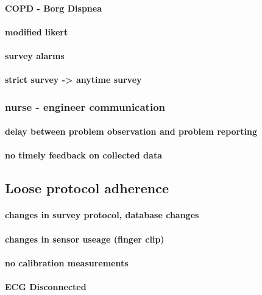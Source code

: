 \paragraph{COPD - Borg Dispnea}
\paragraph{modified likert}
\paragraph{survey alarms}
\paragraph{strict survey -> anytime survey}

\subsubsection{nurse - engineer communication}
\paragraph{delay between problem observation and problem reporting}
\paragraph{no timely feedback on collected data}


\subsection{Loose protocol adherence}
\paragraph{ changes in survey protocol, database changes}
\paragraph{ changes in sensor useage (finger clip)}
\paragraph{ no calibration measurements}
\paragraph{ ECG Disconnected}
